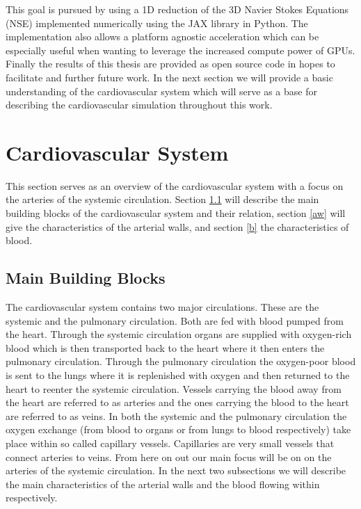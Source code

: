\documentclass[a4paper, oneside]{discothesis}
\begin{document}
This goal is pursued by using a 1D reduction of the 3D Navier Stokes Equations (NSE) implemented numerically using the JAX library in Python.
The implementation also allows a platform agnostic acceleration which can be especially useful when wanting to leverage the increased compute power of GPUs.
Finally the results of this thesis are provided as open source code in hopes to facilitate and further future work.
In the next section we will provide a basic understanding of the cardiovascular system which will serve as a base for describing the cardiovascular simulation throughout this work.




\chapter{Cardiovascular System}
This section serves as an overview of the cardiovascular system with a focus on the arteries of the systemic circulation. 
Section \ref{mbb} will describe the main building blocks of the cardiovascular system and their relation, section \ref{aw} will give the characteristics of the arterial walls, and section \ref{b} the characteristics of blood.
\section{Main Building Blocks} \label{mbb}
The cardiovascular system contains two major circulations.
These are the systemic and the pulmonary circulation. 
Both are fed with blood pumped from the heart.
Through the systemic circulation organs are supplied with oxygen-rich blood which is then transported back to the heart where it then enters the pulmonary circulation.
Through the pulmonary circulation the oxygen-poor blood is sent to the lungs where it is replenished with oxygen and then returned to the heart to reenter the systemic circulation.
Vessels carrying the blood away from the heart are referred to as arteries and the ones carrying the blood to the heart are referred to as veins.
In both the systemic and the pulmonary circulation the oxygen exchange (from blood to organs or from lungs to blood respectively) take place within so called capillary vessels.
Capillaries are very small vessels that connect arteries to veins.
From here on out our main focus will be on on the arteries of the systemic circulation. 
In the next two subsections we will describe the main characteristics of the arterial walls and the blood flowing within respectively.
\end{document}
